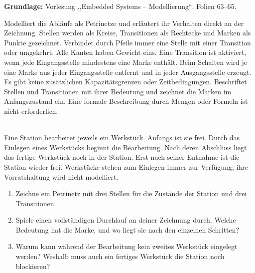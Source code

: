 \newcommand{\printpraesenzlsg}{false}
\newcommand{\printloesungen}{true}
\newcommand{\printbewertungen}{false}
\newcommand{\blattnummer}{2}

\usetikzlibrary{arrows.meta}
\newcommand{\pnmark}[1]{\fill (#1.center) circle (2pt);}


\iforiginal{}

\begin{notes}
\textbf{Grundlage:} Vorlesung ,,Embedded Systems -- Modellierung``, Folien 63--65.\par
Modelliert die Abläufe als Petrinetze und erläutert ihr Verhalten direkt an der Zeichnung.
Stellen werden als Kreise, Transitionen als Rechtecke und Marken als Punkte gezeichnet.
Verbindet durch Pfeile immer eine Stelle mit einer Transition oder umgekehrt.
Alle Kanten haben Gewicht eins.
Eine Transition ist aktiviert, wenn jede Eingangsstelle mindestens eine Marke enthält.
Beim Schalten wird je eine Marke aus jeder Eingangsstelle entfernt und in jeder
Ausgangsstelle erzeugt. Es gibt keine zusätzlichen Kapazitätsgrenzen oder Zeitbedingungen.
Beschriftet Stellen und Transitionen mit ihrer Bedeutung und zeichnet die Marken
im Anfangszustand ein. Eine formale Beschreibung durch Mengen oder Formeln ist nicht erforderlich.
\end{notes}

\\
Eine Station bearbeitet jeweils ein Werkstück. Anfangs ist sie frei.
Durch das Einlegen eines Werkstücks beginnt die Bearbeitung. Nach deren Abschluss
liegt das fertige Werkstück noch in der Station. Erst nach seiner Entnahme ist
die Station wieder frei. Werkstücke stehen zum Einlegen immer zur Verfügung;
ihre Vorratshaltung wird nicht modelliert.
\begin{enumerate}
  \item Zeichne ein Petrinetz mit drei Stellen für die Zustände der Station und drei Transitionen.
  \item Spiele einen vollständigen Durchlauf an deiner Zeichnung durch.
        Welche Bedeutung hat die Marke, und wo liegt sie nach den einzelnen Schritten?
  \item Warum kann während der Bearbeitung kein zweites Werkstück eingelegt werden?
        Weshalb muss auch ein fertiges Werkstück die Station noch blockieren?
\end{enumerate}

